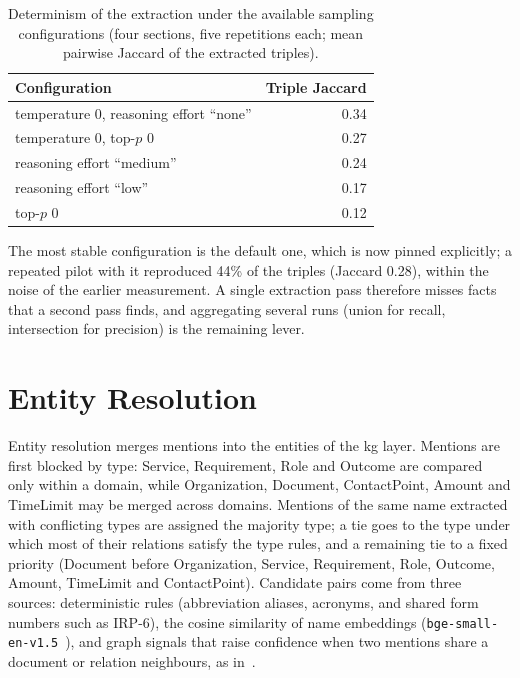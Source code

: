 \begin{table}[ht]
    \centering
    \caption{Determinism of the extraction under the available sampling
             configurations (four sections, five repetitions each; mean pairwise
             Jaccard of the extracted triples).}
    \label{tab:kg:determinism}
    \begin{tabular}{lr}
        \toprule
        Configuration & Triple Jaccard \\
        \midrule
        temperature 0, reasoning effort ``none'' & 0.34 \\
        temperature 0, top-$p$ 0                 & 0.27 \\
        reasoning effort ``medium''              & 0.24 \\
        reasoning effort ``low''                 & 0.17 \\
        top-$p$ 0                                & 0.12 \\
        \bottomrule
    \end{tabular}
\end{table}

The most stable configuration is the default one, which is now pinned explicitly;
a repeated pilot with it reproduced 44\% of the triples (Jaccard 0.28), within the
noise of the earlier measurement. A single extraction pass therefore misses facts
that a second pass finds, and aggregating several runs (union for recall,
intersection for precision) is the remaining lever.


\section{Entity Resolution}\label{sec:kg:er}

Entity resolution merges mentions into the entities of the \gls{kg} layer. Mentions
are first blocked by type: Service, Requirement, Role and Outcome are compared only
within a domain, while Organization, Document, ContactPoint, Amount and TimeLimit
may be merged across domains. Mentions of the same name extracted with conflicting
types are assigned the majority type; a tie goes to the type under which most of
their relations satisfy the type rules, and a remaining tie to a fixed priority
(Document before Organization, Service, Requirement, Role, Outcome, Amount,
TimeLimit and ContactPoint). Candidate pairs come from three sources: deterministic rules
(abbreviation aliases, acronyms, and shared form numbers such as IRP-6), the cosine
similarity of name embeddings (\texttt{bge-small-en-v1.5}~\cite{bge2023}), and graph
signals that raise confidence when two mentions share a document or relation
neighbours, as in~\textcite[ch.~6.1.4]{negro2026kg}.

